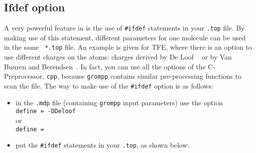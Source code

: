 \subsection{Ifdef option}
\label{subsec:ifdef}
A very powerful feature in {\gromacs} is the use of {\tt \#ifdef}
statements in your {\tt *.top} file. By making use of this statement,
different parameters for one molecule can be used in the same {\tt
*.top} file. An example is given for TFE, where there is an option to
use different charges on the atoms: charges derived by De Loof
{\etal}~\cite{Loof92} or by Van Buuren and
Berendsen~\cite{Buuren93a}. In fact, you can use all the options of the
C-Preprocessor, {\tt cpp}, because {\tt grompp} contains similar pre-processing
functions to scan the file.  The
way to make use of the {\tt \#ifdef} option is as follows:
\begin{itemize}
\item in the {\tt *.mdp} file (containing {\tt grompp} input
      parameters) use the option\\{\tt define = -DDeloof}\\ or
      \\{\tt define = }
\item put the {\tt \#ifdef} statements in your {\tt *.top}, as
      shown below: 
\end{itemize}
